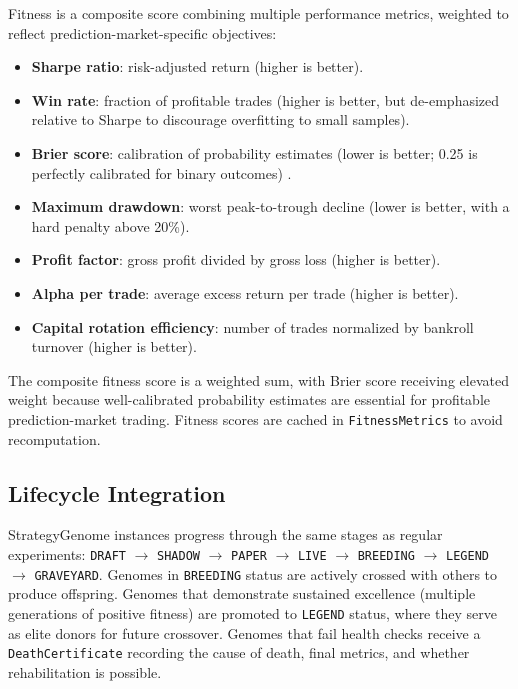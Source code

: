 Fitness is a composite score combining multiple performance metrics, weighted to reflect prediction-market-specific objectives:
\begin{itemize}
    \item \textbf{Sharpe ratio}: risk-adjusted return (higher is better).
    \item \textbf{Win rate}: fraction of profitable trades (higher is better, but de-emphasized relative to Sharpe to discourage overfitting to small samples).
    \item \textbf{Brier score}: calibration of probability estimates (lower is better; 0.25 is perfectly calibrated for binary outcomes) \citep{brier1950verification}.
    \item \textbf{Maximum drawdown}: worst peak-to-trough decline (lower is better, with a hard penalty above 20\%).
    \item \textbf{Profit factor}: gross profit divided by gross loss (higher is better).
    \item \textbf{Alpha per trade}: average excess return per trade (higher is better).
    \item \textbf{Capital rotation efficiency}: number of trades normalized by bankroll turnover (higher is better).
\end{itemize}

The composite fitness score is a weighted sum, with Brier score receiving elevated weight because well-calibrated probability estimates are essential for profitable prediction-market trading. Fitness scores are cached in \texttt{FitnessMetrics} to avoid recomputation.

\subsection{Lifecycle Integration}

StrategyGenome instances progress through the same stages as regular experiments: \texttt{DRAFT} $\rightarrow$ \texttt{SHADOW} $\rightarrow$ \texttt{PAPER} $\rightarrow$ \texttt{LIVE} $\rightarrow$ \texttt{BREEDING} $\rightarrow$ \texttt{LEGEND} $\rightarrow$ \texttt{GRAVEYARD}. Genomes in \texttt{BREEDING} status are actively crossed with others to produce offspring. Genomes that demonstrate sustained excellence (multiple generations of positive fitness) are promoted to \texttt{LEGEND} status, where they serve as elite donors for future crossover. Genomes that fail health checks receive a \texttt{DeathCertificate} recording the cause of death, final metrics, and whether rehabilitation is possible.

